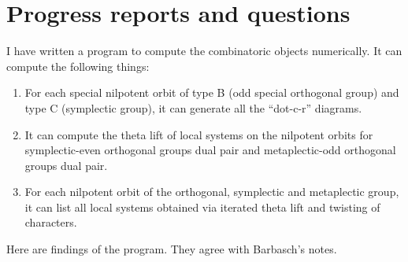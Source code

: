 \documentclass[12pt,a4paper]{amsart}
\numberwithin{equation}{section}
\theoremstyle{remark}
\begin{document}
\clearpage
\section*{\color{blue} Progress reports and questions}
I have written a program to compute the combinatoric objects
numerically.
It can compute the following things:
\begin{enumerate}
\item For each special nilpotent orbit of type B (odd special orthogonal group) and type C (symplectic group),
  it can generate all the ``dot-c-r'' diagrams.
\item It can compute the theta lift of local systems on the nilpotent orbits
  for symplectic-even orthogonal groups dual pair and metaplectic-odd orthogonal
  groups dual pair.   
\item For each nilpotent orbit of the orthogonal, symplectic and metaplectic group,
  it can list all local systems obtained via iterated theta lift and
  twisting of characters.   
\end{enumerate}

Here are findings of the program. They {\color{red} agree } with Barbasch's notes.
\end{document}

